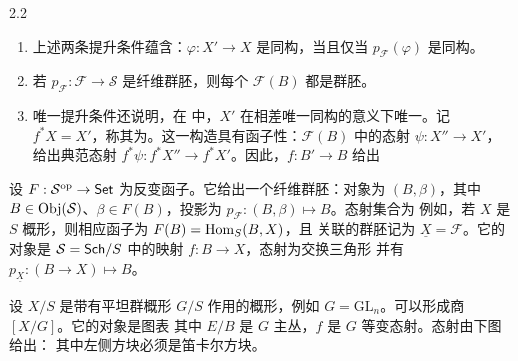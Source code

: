 \begin{Note}{2.2}
\begin{enumerate}[label=(\roman*)]
\item 上述两条提升条件蕴含：$\varphi:X'\to X$ 是同构，当且仅当 $p_{\mathcal F}(\varphi)$ 是同构。
\item 若 $p_{\mathcal F}:\mathcal F\to\mathcal S$ 是纤维群胚，则每个 $\mathcal F(B)$ 都是群胚。
\item 唯一提升条件还说明，在
中，$X'$ 在相差唯一同构的意义下唯一。记 $f^*X=X'$，称其为。这一构造具有函子性：$\mathcal F(B)$ 中的态射 $\psi:X''\to X'$，给出典范态射 $f^*\psi:f^*X''\to f^*X'$。因此，$f:B'\to B$ 给出
\end{enumerate}
\end{Note}
\begin{example}[（可表函子）]\label{ex:2.4}
设 $F:\mathcal S^{\mathrm{op}}\to\mathsf{Set}$ 为反变函子。它给出一个纤维群胚：对象为 $(B,\beta)$，其中 $B\in\operatorname{Obj}(\mathcal S)$、$\beta\in F(B)$，投影为 $p_{\mathcal F}:(B,\beta)\mapsto B$。态射集合为
例如，若 $X$ 是 $S$ 概形，则相应函子为 $F(B)=\operatorname{Hom}_S(B,X)$，且
关联的群胚记为 $\underline X=\mathcal F$。它的对象是 $\mathcal S=\mathsf{Sch}/S$ 中的映射 $f:B\to X$，态射为交换三角形
并有 $p_{\underline X}:(B\to X)\mapsto B$。
\end{example}
\begin{example}[（商叠）]\label{ex:2.5}
设 $X/S$ 是带有平坦群概形 $G/S$ 作用的概形，例如 $G=\mathrm{GL}_n$。可以形成商 $[X/G]$。它的对象是图表
其中 $E/B$ 是 $G$ 主丛，$f$ 是 $G$ 等变态射。态射由下图给出：
其中左侧方块必须是笛卡尔方块。
\end{example}
